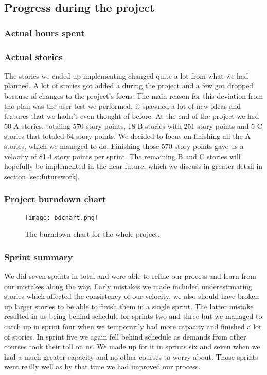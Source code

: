\subsection{Progress during the project}

	\subsubsection{Actual hours spent}

	
	\subsubsection{Actual stories}
		The stories we ended up implementing changed quite a lot from what we had planned. A lot of stories got added a during the project and a few got dropped because of changes to the project's focus. The main reason for this deviation from the plan was the user test we performed, it spawned a lot of new ideas and features that we hadn't even thought of before. At the end of the project we had 50 A stories, totaling 570 story points, 18 B stories with 251 story points and 5 C stories that totaled 64 story points. We decided to focus on finishing all the A stories, which we managed to do. Finishing those 570 story points gave us a velocity of 81.4 story points per sprint. The remaining B and C stories will hopefully be implemented in the near future, which we discuss in greater detail in section \ref{sec:futurework}.

	\subsubsection{Project burndown chart}
		
		\begin{figure}[H]
		  \centering
		  \graphicspath{ {./graphics/} }
		  \centerline{\texttt{[image: bdchart.png]}}
		  \caption{\label{fig:bdchart} The burndown chart for the whole project.}
		\end{figure}

	\subsubsection{Sprint summary}
  We did seven sprints in total and were able to refine our process and learn from our mistakes along the way. Early mistakes we made included underestimating stories which affected the consistency of our velocity, we also should have broken up larger stories to be able to finish them in a single sprint. The latter mistake resulted in us being behind schedule for sprints two and three but we managed to catch up in sprint four when we temporarily had more capacity and finished a lot of stories. In sprint five we again fell behind schedule as demands from other courses took their toll on us. We made up for it in sprints six and seven when we had a much greater capacity and no other courses to worry about. Those sprints went really well as by that time we had improved our process. 


